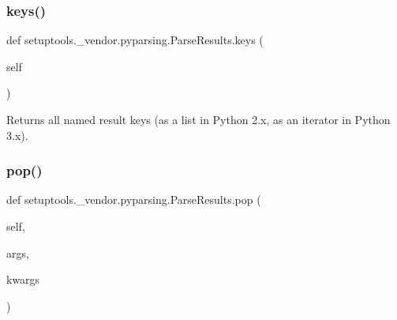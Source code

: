 \subsubsection{\texorpdfstring{keys()}{keys()}}
{\footnotesize\ttfamily def setuptools.\+\_\+vendor.\+pyparsing.\+Parse\+Results.\+keys (\begin{DoxyParamCaption}\item[{}]{self }\end{DoxyParamCaption})}

\begin{DoxyVerb}Returns all named result keys (as a list in Python 2.x, as an iterator in Python 3.x).\end{DoxyVerb}
 \mbox{\label{classsetuptools_1_1__vendor_1_1pyparsing_1_1ParseResults_ae1b6359f87bc468ff9f6199c3b515a6f}} 
\subsubsection{\texorpdfstring{pop()}{pop()}}
{\footnotesize\ttfamily def setuptools.\+\_\+vendor.\+pyparsing.\+Parse\+Results.\+pop (\begin{DoxyParamCaption}\item[{}]{self,  }\item[{}]{args,  }\item[{}]{kwargs }\end{DoxyParamCaption})}

